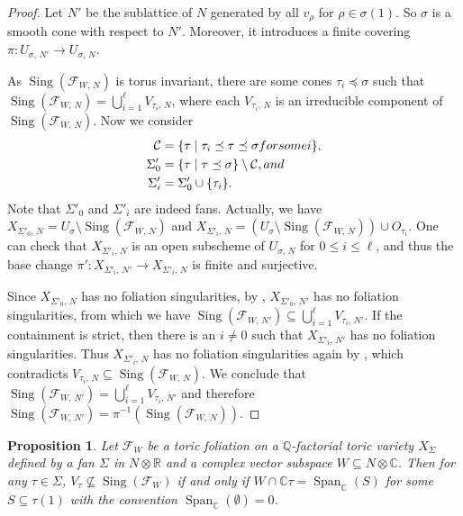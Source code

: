 \documentclass[12pt,reqno]{amsart}
\newtheorem{proposition}[theorem]{Proposition}
\theoremstyle{definition}
\newcommand{\mc}{\mathcal}
\newcommand{\on}{\operatorname}
\newcommand\cF{{\mathcal{F}}}
\newcommand\bC{{\mathbb C}}
\newcommand\bQ{{\mathbb Q}}
\newcommand\bR{{\mathbb R}}
\begin{document}
\begin{proof}
    Let $N'$ be the sublattice of $N$ generated by all $v_\rho$ for $\rho\in\sigma(1)$. 
    So $\sigma$ is a smooth cone with respect to $N'$. 
    Moreover, it introduces a finite covering $\pi\colon U_{\sigma,\,N'}\to U_{\sigma,\,N}$.  

    As $\on{Sing}(\cF_{W,\,N})$ is torus invariant, there are some cones $\tau_i\preceq\sigma$ such that $\on{Sing}(\cF_{W,\,N}) =\bigcup_{i=1}^\ell V_{\tau_i,\,N}$, where each $V_{\tau_i,\,N}$ is an irreducible component of $\on{Sing}(\cF_{W,\,N})$.
    Now we consider 
    \begin{align*}
        \mc C&=\{\tau\mid\tau_i\preceq\tau\preceq\sigma \textnormal{ for some } i\}, \\
        \Sigma'_0 &=\{\tau\mid\tau\preceq\sigma\}\setminus \mc C, \textnormal{ and}\\
        \Sigma'_i &=\Sigma'_0\cup\{\tau_i\}.
    \end{align*}
    Note that $\Sigma'_0$ and $\Sigma'_i$ are indeed fans. 
    Actually, we have $X_{\Sigma'_0,\,N}=U_\sigma\setminus\on{Sing}(\mc F_{W,\,N})$ and $X_{\Sigma'_i,\,N}=(U_\sigma\setminus\on{Sing}(\mc F_{W,\,N}))\cup O_{\tau_i}$. 
    One can check that $X_{\Sigma'_i,\,N}$ is an open subscheme of $U_{\sigma,\,N}$  for $0\leq i\leq\ell$, and thus the base change $\pi'\colon X_{\Sigma'_i,\,N'}\to X_{\Sigma'_i,\,N}$ is finite and surjective. 

    Since $X_{\Sigma'_0,\,N}$ has no foliation singularities, by \cite[Proposition 5.13]{druel2021foliation}, $X_{\Sigma'_0,\,N'}$ has no foliation singularities, from which we have $\on{Sing}(\cF_{W,\,N'})\subseteq\bigcup_{i=1}^\ell V_{\tau_i,\,N'}$. 
    If the containment is strict, then there is an $i\neq 0$ such that $X_{\Sigma'_i,\,N'}$ has no foliation singularities. 
    Thus $X_{\Sigma'_i,\,N}$ has no foliation singularities again by \cite[Proposition 5.13]{druel2021foliation}, which contradicts $V_{\tau_i,\,N}\subseteq\on{Sing}(\cF_{W,\,N})$.  
    We conclude that $\on{Sing}(\cF_{W,\,N'}) = \bigcup_{i=1}^\ell V_{\tau_i,\,N'}$ and therefore $\on{Sing}(\cF_{W,\,N'}) = \pi^{-1}(\on{Sing}(\cF_{W,\,N}))$. 
\end{proof}

\begin{proposition}\label{singularlocus}
    Let $\cF_W$ be a toric foliation on a $\bQ$-factorial toric variety $X_\Sigma$ defined by a fan $\Sigma$ in $N\otimes\bR$ and a complex vector subspace $W\subseteq N\otimes\bC$. 
    Then for any $\tau\in\Sigma$, $V_\tau\nsubseteq\on{Sing}(\cF_W)$ if and only if $W\cap\bC\tau=\on{Span}_\bC(S)$ for some $S\subseteq \tau(1)$ with the convention $\on{Span}_\bC(\emptyset)=0$.
\end{proposition}
\end{document}
